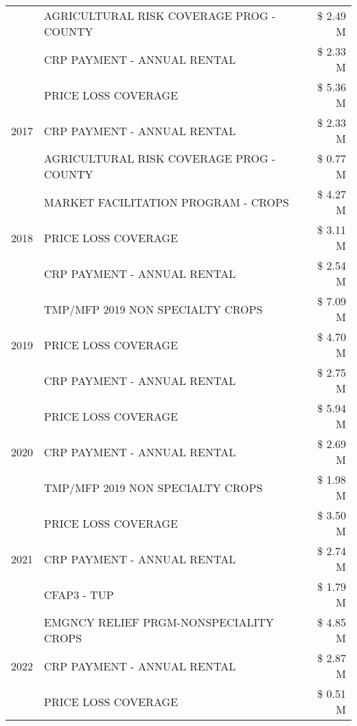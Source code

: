 \begin{tabular}{llr}
 & AGRICULTURAL RISK COVERAGE PROG - COUNTY & \$ 2.49 M \\
 & CRP PAYMENT - ANNUAL RENTAL & \$ 2.33 M \\
\cline{1-3}
\multirow[t]{3}{*}{2017} & PRICE LOSS COVERAGE & \$ 5.36 M \\
 & CRP PAYMENT - ANNUAL RENTAL & \$ 2.33 M \\
 & AGRICULTURAL RISK COVERAGE PROG - COUNTY & \$ 0.77 M \\
\cline{1-3}
\multirow[t]{3}{*}{2018} & MARKET FACILITATION PROGRAM - CROPS & \$ 4.27 M \\
 & PRICE LOSS COVERAGE & \$ 3.11 M \\
 & CRP PAYMENT - ANNUAL RENTAL & \$ 2.54 M \\
\cline{1-3}
\multirow[t]{3}{*}{2019} & TMP/MFP 2019 NON SPECIALTY CROPS & \$ 7.09 M \\
 & PRICE LOSS COVERAGE & \$ 4.70 M \\
 & CRP PAYMENT - ANNUAL RENTAL & \$ 2.75 M \\
\cline{1-3}
\multirow[t]{3}{*}{2020} & PRICE LOSS COVERAGE & \$ 5.94 M \\
 & CRP PAYMENT - ANNUAL RENTAL & \$ 2.69 M \\
 & TMP/MFP 2019 NON SPECIALTY CROPS & \$ 1.98 M \\
\cline{1-3}
\multirow[t]{3}{*}{2021} & PRICE LOSS COVERAGE & \$ 3.50 M \\
 & CRP PAYMENT - ANNUAL RENTAL & \$ 2.74 M \\
 & CFAP3 - TUP & \$ 1.79 M \\
\cline{1-3}
\multirow[t]{3}{*}{2022} & EMGNCY RELIEF PRGM-NONSPECIALITY CROPS & \$ 4.85 M \\
 & CRP PAYMENT - ANNUAL RENTAL & \$ 2.87 M \\
 & PRICE LOSS COVERAGE & \$ 0.51 M \\
\cline{1-3}
\bottomrule
\end{tabular}
